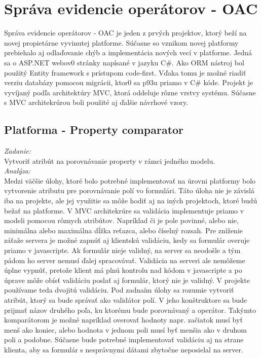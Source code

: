 \documentclass[11pt, oneside]{report}
\begin{document}
\section{Správa evidencie operátorov - OAC}
Správa evidencie operátorov - OAC  je jeden z prvých projektov, ktorý beží na novej propietárne vyvinutej platforme. Súčasne so vznikom  novej platformy prebiehalo aj odlaďovanie chýb  a implementácia nových vecí v platforme. Jedná sa o ASP.NET webov0 stránky napísané v jazyku C\#. Ako ORM nástroj  bol použitý Entity framework s prístupom code-first. Vďaka tomu je možné riadiť verziu  databázy pomocou migrácii, ktor0 sa p93u priamo v C\# kóde. Projekt je vyvíjaný podľa architektúry MVC, ktorá oddeluje rôzne vrstvy systému. Súčasne s MVC architekrúrou boli použité aj ďalšie návrhové vzory. 

\subsection{Platforma - Property  comparator}\label{sssec:num1}
\textit{Zadanie:}\\
Vytvoriť atribút na porovnávanie property v rámci jedného modelu.
\\\textit{Analýza:}\\
Medzi väčšie  úlohy, ktoré  bolo potrebné implementovať na úrovni platformy bolo vytvorenie atributu pre porovnávanie polí vo formulári. Táto úloha nie je  závislá iba na projekte, ale  jej využitie sa môže hodiť aj na iných projektoch, ktoré budú bežať na platforme. V MVC architekrúre sa validácia implementuje priamo v modeli pomocou rôznych atribútov. Napríklad či je pole povinné, alebo nie, minimálna alebo maximálna dĺžka reťazca, alebo číselný rozsah. Pre zníženie záťaže servera je možné zapnúť aj klientskú validáciu, kedy sa formulár overuje priamo v javascripte. Ak formulár nieje  validný, na server sa neodošle a tým pádom ho server nemusí ďalej spracovávať. Validácia  na serveri ale nemôžeme úplne vypnúť, pretože klient  má plnú kontrolu nad kódom v javascripte a po  úprave môže obísť validáciu poslať aj formulár, ktorý nie je validný. V projekte používame teda dvojitú validáciu. Pod zadnaím úlohy sa rozumie vytvoriť atribút, ktorý sa bude správať ako validátor polí. V jeho konštruktore  sa bude prijmať názov druhého poľa, ku ktorému bude porovnávaný a operátor. Takýmto komparátorom je možné napríklad  overovať hodnoty napr. začiatok musí byť menš ako koniec, alebo hodnota v jednom poli musí byť menšia ako v druhom poli a podobne. Súčasne bude potrebné implementovať validáciu aj na strane klienta, aby sa  formulár s nesprávnymi dátami zbytočne neposielal na server.
\end{document}
